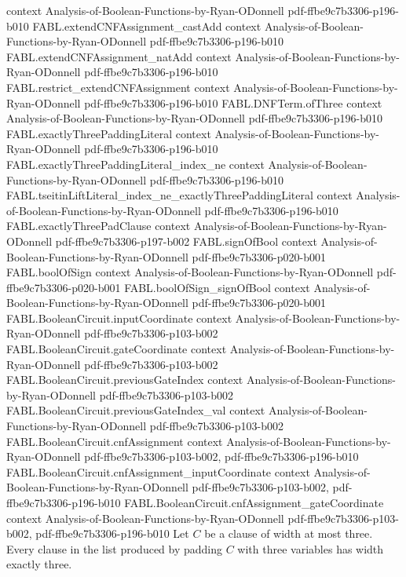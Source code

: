 \begin{theorem}
  {context}
  {Analysis-of-Boolean-Functions-by-Ryan-ODonnell}
  {pdf-ffbe9c7b3306-p196-b010}
\proofstep
  {FABL.extendCNFAssignment_castAdd}
  {context}
  {Analysis-of-Boolean-Functions-by-Ryan-ODonnell}
  {pdf-ffbe9c7b3306-p196-b010}
\proofstep
  {FABL.extendCNFAssignment_natAdd}
  {context}
  {Analysis-of-Boolean-Functions-by-Ryan-ODonnell}
  {pdf-ffbe9c7b3306-p196-b010}
\proofstep
  {FABL.restrict_extendCNFAssignment}
  {context}
  {Analysis-of-Boolean-Functions-by-Ryan-ODonnell}
  {pdf-ffbe9c7b3306-p196-b010}
\proofstep
  {FABL.DNFTerm.ofThree}
  {context}
  {Analysis-of-Boolean-Functions-by-Ryan-ODonnell}
  {pdf-ffbe9c7b3306-p196-b010}
\proofstep
  {FABL.exactlyThreePaddingLiteral}
  {context}
  {Analysis-of-Boolean-Functions-by-Ryan-ODonnell}
  {pdf-ffbe9c7b3306-p196-b010}
\proofstep
  {FABL.exactlyThreePaddingLiteral_index_ne}
  {context}
  {Analysis-of-Boolean-Functions-by-Ryan-ODonnell}
  {pdf-ffbe9c7b3306-p196-b010}
\proofstep
  {FABL.tseitinLiftLiteral_index_ne_exactlyThreePaddingLiteral}
  {context}
  {Analysis-of-Boolean-Functions-by-Ryan-ODonnell}
  {pdf-ffbe9c7b3306-p196-b010}
\proofstep
  {FABL.exactlyThreePadClause}
  {context}
  {Analysis-of-Boolean-Functions-by-Ryan-ODonnell}
  {pdf-ffbe9c7b3306-p197-b002}
\proofstep
  {FABL.signOfBool}
  {context}
  {Analysis-of-Boolean-Functions-by-Ryan-ODonnell}
  {pdf-ffbe9c7b3306-p020-b001}
\proofstep
  {FABL.boolOfSign}
  {context}
  {Analysis-of-Boolean-Functions-by-Ryan-ODonnell}
  {pdf-ffbe9c7b3306-p020-b001}
\proofstep
  {FABL.boolOfSign_signOfBool}
  {context}
  {Analysis-of-Boolean-Functions-by-Ryan-ODonnell}
  {pdf-ffbe9c7b3306-p020-b001}
\proofstep
  {FABL.BooleanCircuit.inputCoordinate}
  {context}
  {Analysis-of-Boolean-Functions-by-Ryan-ODonnell}
  {pdf-ffbe9c7b3306-p103-b002}
\proofstep
  {FABL.BooleanCircuit.gateCoordinate}
  {context}
  {Analysis-of-Boolean-Functions-by-Ryan-ODonnell}
  {pdf-ffbe9c7b3306-p103-b002}
\proofstep
  {FABL.BooleanCircuit.previousGateIndex}
  {context}
  {Analysis-of-Boolean-Functions-by-Ryan-ODonnell}
  {pdf-ffbe9c7b3306-p103-b002}
\proofstep
  {FABL.BooleanCircuit.previousGateIndex_val}
  {context}
  {Analysis-of-Boolean-Functions-by-Ryan-ODonnell}
  {pdf-ffbe9c7b3306-p103-b002}
\proofstep
  {FABL.BooleanCircuit.cnfAssignment}
  {context}
  {Analysis-of-Boolean-Functions-by-Ryan-ODonnell}
  {pdf-ffbe9c7b3306-p103-b002,
    pdf-ffbe9c7b3306-p196-b010}
\proofstep
  {FABL.BooleanCircuit.cnfAssignment_inputCoordinate}
  {context}
  {Analysis-of-Boolean-Functions-by-Ryan-ODonnell}
  {pdf-ffbe9c7b3306-p103-b002,
    pdf-ffbe9c7b3306-p196-b010}
\proofstep
  {FABL.BooleanCircuit.cnfAssignment_gateCoordinate}
  {context}
  {Analysis-of-Boolean-Functions-by-Ryan-ODonnell}
  {pdf-ffbe9c7b3306-p103-b002,
    pdf-ffbe9c7b3306-p196-b010}
Let $C$ be a clause of width at most three. Every clause in the list produced by padding
$C$ with three variables has width exactly three.
\end{theorem}

